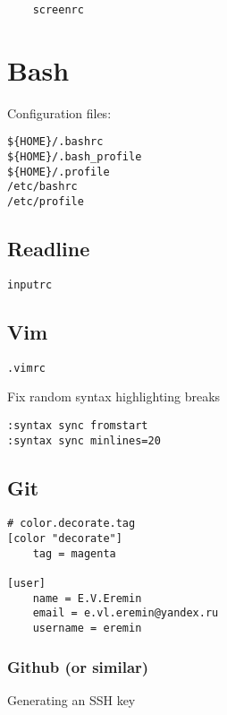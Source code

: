 \documentclass{article}
\begin{document}
\begin{verbatim}
	screenrc
\end{verbatim}



\section{Bash}

Configuration files:

\begin{verbatim}
${HOME}/.bashrc
${HOME}/.bash_profile
${HOME}/.profile
/etc/bashrc
/etc/profile
\end{verbatim}

\subsection{Readline}

\begin{verbatim}
inputrc
\end{verbatim}

\subsection{Vim}

\begin{verbatim}
.vimrc
\end{verbatim}

Fix random syntax highlighting breaks

\begin{verbatim}
:syntax sync fromstart
:syntax sync minlines=20
\end{verbatim}

\subsection{Git}

\begin{verbatim}
# color.decorate.tag
[color "decorate"]
	tag = magenta

[user]
	name = E.V.Eremin
	email = e.vl.eremin@yandex.ru
	username = eremin
\end{verbatim}

\subsubsection{Github (or similar)}

Generating an SSH key
\end{document}
